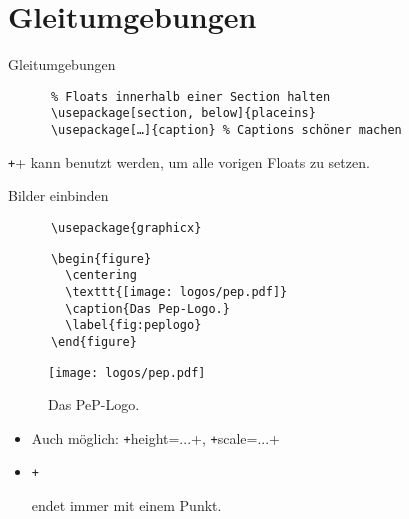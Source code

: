 \section{Gleitumgebungen}
\begin{frame}[fragile]{
  Gleitumgebungen
  \hfill
}
  \begin{Packages}
    \begin{verbatim}
      % Floats innerhalb einer Section halten
      \usepackage[section, below]{placeins}
      \usepackage[…]{caption} % Captions schöner machen
    \end{verbatim}
  \end{Packages}

  \texttt+\FloatBarrier+ kann benutzt werden, um alle vorigen Floats zu setzen.
\end{frame}

\begin{frame}[fragile]{
  Bilder einbinden
  \hfill
}
  \begin{Packages}
    \begin{verbatim}
      \usepackage{graphicx}
    \end{verbatim}
  \end{Packages}
  \begin{CodeExample}{0.65}
    \begin{verbatim}
      \begin{figure}
        \centering
        \texttt{[image: logos/pep.pdf]}
        \caption{Das Pep-Logo.}
        \label{fig:peplogo}
      \end{figure}
    \end{verbatim}
  \CodeResult
    \begin{figure}
      \centering
      \texttt{[image: logos/pep.pdf]}
      \caption{Das PeP-Logo.}
      \label{fig:peplogo}
    \end{figure}
  \end{CodeExample}
  \vspace{5pt}
  \begin{itemize}
    \item Auch möglich: \texttt+height=...+, \texttt+scale=...+
    \item \texttt+\caption+ endet immer mit einem Punkt.
  \end{itemize}
\end{frame}

